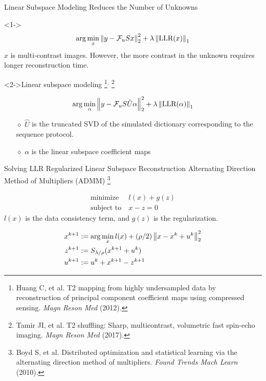 \begin{frame}{Linear Subspace Modeling Reduces the Number of Unknowns}
	\begin{block}<1->{}
	{\large
	\begin{equation}
		\mathrm{arg}\min_x \left\|y - \mathcal{F}_u S x\right\|_2^2 + \lambda \left\|\text{LLR}(x)\right\|_1
	\end{equation}
	$x$ is multi-contrast images. However, the more contrast in the unknown requires longer reconstruction time.}
	\end{block}

	\begin{block}<2->{Linear subspace modeling 
		\footnote{Huang C, et al. T2 mapping from highly undersampled data by reconstruction of principal component coefficient maps using compressed sensing. \textit{Magn Reson Med} (2012).}$^,$
		\footnote{Tamir JI, et al. T2 shuffling: Sharp, multicontrast, volumetric fast spin-echo imaging. \textit{Magn Reson Med} (2017).}}
	{\large
	\begin{equation}
		\mathrm{arg}\min_\alpha \left\|y - \mathcal{F}_u S \hat{U} \alpha\right\|_2^2 + \lambda \left\|\text{LLR}(\alpha)\right\|_1
	\end{equation}
	\begin{itemize}
		\item [$\diamond$] $\hat{U}$ is the truncated SVD of the simulated dictionary corresponding to the sequence protocol.
		\item [$\diamond$] $\alpha$ is the linear subspace coefficient maps
	\end{itemize}}
	\end{block}
\end{frame}

\begin{frame}{Solving LLR Regularized Linear Subspace Reconstruction}
Alternating Direction Method of Multipliers (ADMM) 
\footnote{Boyd S, et al. Distributed optimization and statistical learning via the alternating direction method of multipliers. \textit{Found Trends Mach Learn} (2010).}

\begin{equation}
\begin{aligned}
	\text{minimize}~&l(x) + g(z) \\
	\text{subject to}~&x - z =0
\end{aligned}
\end{equation}
$l(x)$ is the data consistency term, and $g(z)$ is the regularization.

\vspace{1em}

\begin{equation}
\begin{aligned}
	x^{k+1} &:= \mathrm{arg}\min_x l(x) + (\rho/2) \left\|x - x^k + u^k\right\|_2^2 \\
	z^{k+1} &:= S_{\lambda/\rho} (x^{k+1} + u^{k}) \\
	u^{k+1} &:= u^k + x^{k+1} - z^{k+1}
\end{aligned}
\end{equation}

\end{frame}

